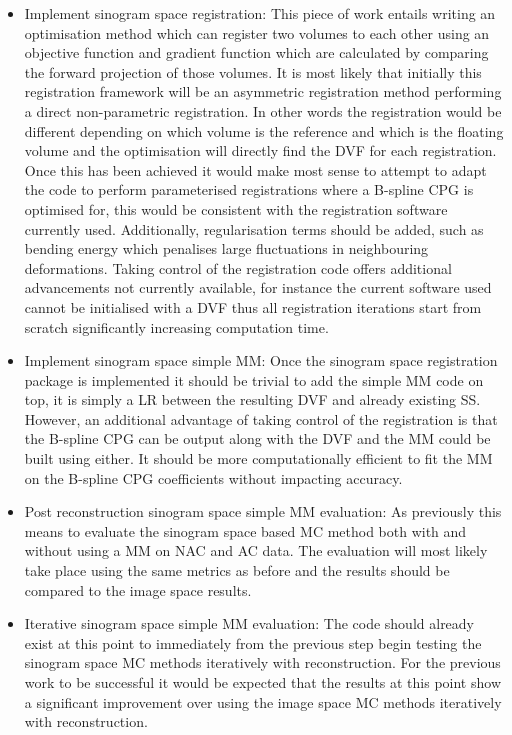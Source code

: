 \begin{itemize}
                \item Implement sinogram space registration: This piece of work entails writing an optimisation method which can register two volumes to each other using an objective function and gradient function which are calculated by comparing the forward projection of those volumes. It is most likely that initially this registration framework will be an asymmetric registration method performing a direct non-parametric registration. In other words the registration would be different depending on which volume is the reference and which is the floating volume and the optimisation will directly find the \gls{DVF} for each registration. Once this has been achieved it would make most sense to attempt to adapt the code to perform parameterised registrations where a B-spline \gls{CPG} is optimised for, this would be consistent with the registration software currently used. Additionally, regularisation terms should be added, such as bending energy which penalises large fluctuations in neighbouring deformations. Taking control of the registration code offers additional advancements not currently available, for instance the current software used cannot be initialised with a \gls{DVF} thus all registration iterations start from scratch significantly increasing computation time.
    
                \item Implement sinogram space simple \gls{MM}: Once the sinogram space registration package is implemented it should be trivial to add the simple \gls{MM} code on top, it is simply a \gls{LR} between the resulting \gls{DVF} and already existing \gls{SS}. However, an additional advantage of taking control of the registration is that the B-spline \gls{CPG} can be output along with the \gls{DVF} and the \gls{MM} could be built using either. It should be more computationally efficient to fit the \gls{MM} on the B-spline \gls{CPG} coefficients without impacting accuracy.
    
                \item Post reconstruction sinogram space simple \gls{MM} evaluation: As previously this means to evaluate the sinogram space based \gls{MC} method both with and without using a \gls{MM} on \gls{NAC} and \gls{AC} data. The evaluation will most likely take place using the same metrics as before and the results should be compared to the image space results.
    
                \item Iterative sinogram space simple \gls{MM} evaluation: The code should already exist at this point to immediately from the previous step begin testing the sinogram space \gls{MC} methods iteratively with reconstruction. For the previous work to be successful it would be expected that the results at this point show a significant improvement over using the image space \gls{MC} methods iteratively with reconstruction.
    

\end{itemize}

